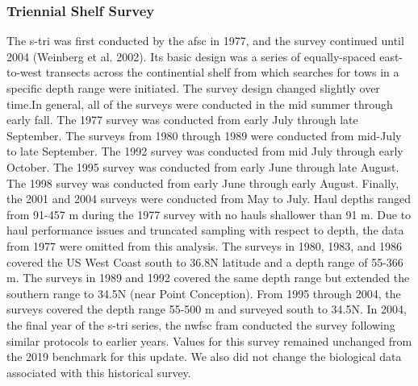 \documentclass[11pt,
  english,
  a4paper,
]{article}
\begin{document}

\hypertarget{triennial-shelf-survey}{%
\subsubsection{Triennial Shelf Survey}\label{triennial-shelf-survey}}

\leavevmode\tagmcend\tagstructend

The \gls{s-tri} was first conducted by the \gls{afsc} in 1977, and the survey continued until 2004 {(Weinberg et al. 2002)\leavevmode\tagmcend\tagstructend}. Its basic design was a series of equally-spaced east-to-west transects across the continential shelf from which searches for tows in a specific depth range were initiated. The survey design changed slightly over time.In general, all of the surveys were conducted in the mid summer through early fall. The 1977 survey was conducted from early July through late September. The surveys from 1980 through 1989 were conducted from mid-July to late September. The 1992 survey was conducted from mid July through early October. The 1995 survey was conducted from early June through late August. The 1998 survey was conducted from early June through early August. Finally, the 2001 and 2004 surveys were conducted from May to July. Haul depths ranged from 91-457 m during the 1977 survey with no hauls shallower than 91 m. Due to haul performance issues and truncated sampling with respect to depth, the data from 1977 were omitted from this analysis. The surveys in 1980, 1983, and 1986 covered the US West Coast south to 36.8\textdegree N latitude and a depth range of 55-366 m. The surveys in 1989 and 1992 covered the same depth range but extended the southern range to 34.5\textdegree N (near Point Conception). From 1995 through 2004, the surveys covered the depth range 55-500 m and surveyed south to 34.5\textdegree N. In 2004, the final year of the \gls{s-tri} series, the \gls{nwfsc} \gls{fram} conducted the survey following similar protocols to earlier years. Values for this survey remained unchanged from the 2019 benchmark for this update. We also did not change the biological data associated with this historical survey.
\end{document}

